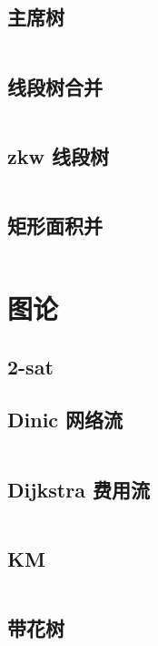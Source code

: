 \documentclass[a4paper, twoside]{article}
\begin{document}
\begin{multicols}{2}
			\subsection{主席树}
				\inputminted{cpp}{../src-midori/datastructure/主席树.cpp}
			
			\subsection{线段树合并}
				\inputminted{cpp}{../src-midori/datastructure/线段树合并.cpp}

			\subsection{zkw 线段树}
				\inputminted{cpp}{../src-midori/datastructure/zkw-segtree.cpp}
			
			\subsection{矩形面积并}
				\inputminted{cpp}{../src-midori/datastructure/矩形面积并.cpp}
				
		\newpage
		\section{图论}

			\subsection{2-sat}
			
			\subsection{Dinic 网络流}
				\inputminted{cpp}{../src-midori/graph/dinic.cpp}
			
			\subsection{Dijkstra 费用流}
				\inputminted{cpp}{../src-midori/graph/dijkstra费用流.cpp}
			
			\subsection{KM}
				\inputminted{cpp}{../src-midori/graph/二分图最大带权匹配.cpp}
			
			\subsection{带花树}
				\inputminted{cpp}{../src-midori/graph/带花树.cpp}
			

\end{multicols}
\end{document}
